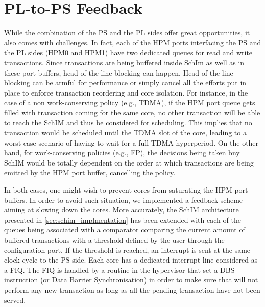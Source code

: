 \section{PL-to-PS Feedback}
    
    While the combination of the PS and the PL sides offer great opportunities, it also comes with challenges. In fact, each of the HPM ports interfacing the PS and the PL sides (HPM0 and HPM1) have two dedicated queues for read and write transactions. Since transactions are being buffered inside SchIm as well as in these port buffers, head-of-the-line blocking can happen. Head-of-the-line blocking can be armful for performance or simply cancel all the efforts put in place to enforce transaction reordering and core isolation. For instance, in the case of a non work-conserving policy (e.g., TDMA), if the HPM port queue gets filled with transaction coming for the same core, no other transaction will be able to reach the SchIM and thus be considered for scheduling. This implies that no transaction would be scheduled until the TDMA slot of the core, leading to a worst case scenario of having to wait for a full TDMA hyperperiod. On the other hand, for work-conserving policies (e.g., FP), the decisions being taken bny SchIM would be totally dependent on the order at which transactions are being emitted by the HPM port buffer, cancelling the policy.
    
    In both cases, one might wish to prevent cores from saturating the HPM port buffers. In order to avoid such situation, we implemented a feedback scheme aiming at slowing down the cores. More accurately, the SchIM architecture presented in \ref{sec:schim_implmentation} has been extended with each of the queues being associated with a comparator comparing the current amount of buffered transactions with a threshold defined by the user through the configuration port. If the threshold is reached, an interrupt is sent at the same clock cycle to the PS side. Each core has a dedicated interrupt line considered as a FIQ. The FIQ is handled by a routine in the hypervisor that set a DBS instruction (or Data Barrier Synchronisation) in order to make sure that will not perform any new transaction as long as all the pending transaction have not been served.
    
